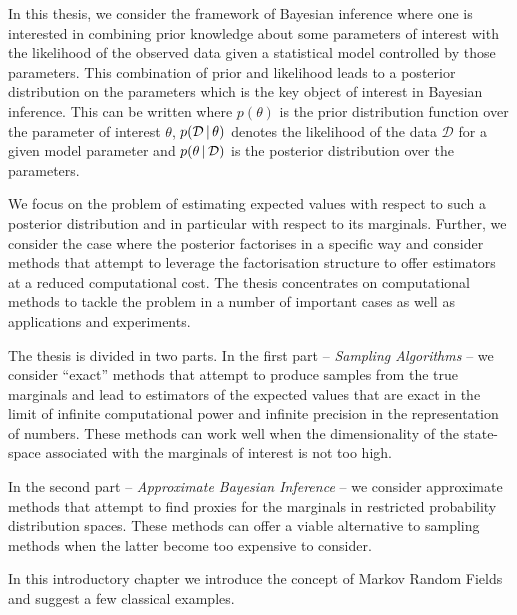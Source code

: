 
In this thesis, we consider the framework of Bayesian inference where one is interested in combining prior knowledge about some parameters of interest with the likelihood of the observed data given a statistical model controlled by those parameters. This combination of prior and likelihood leads to a posterior distribution on the parameters which is the key object of interest in Bayesian inference. This can be written
where $p(\theta)$ is the prior distribution function over the parameter of interest $\theta$, $p(\mathcal D\,|\, \theta)$ denotes the likelihood of the data $\mathcal D$ for a given model parameter and $p(\theta\,|\, \mathcal D)$ is the posterior distribution over the parameters. 

We focus on the problem of estimating expected values with respect to such a posterior distribution and in particular with respect to its marginals. Further, we consider the case where the posterior factorises in a specific way and consider methods that attempt to leverage the factorisation structure to offer estimators at a reduced computational cost. The thesis concentrates on computational methods to tackle the problem in a number of important cases as well as applications and experiments. 

The thesis is divided in two parts. In the first part -- \emph{Sampling Algorithms} -- we consider ``exact'' methods that attempt to produce samples from the true marginals and lead to estimators of the expected values that are exact in the limit of infinite computational power and infinite precision in the representation of numbers. These methods can work well when the dimensionality of the state-space associated with the marginals of interest is not too high. 

In the second part -- \emph{Approximate Bayesian Inference} -- we consider approximate methods that attempt to find proxies for the marginals in restricted probability distribution spaces. These methods can offer a viable alternative to sampling methods when the latter become too expensive to consider. 

In this introductory chapter we introduce the concept of Markov Random Fields and suggest a few classical examples.

